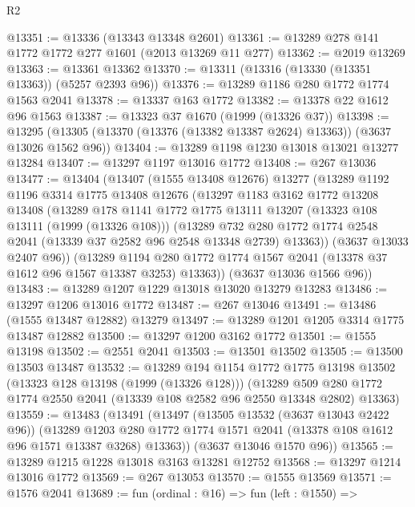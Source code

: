 \begin{lexlean}{R2}
\begin{coremodule}
@13351 := @13336 (@13343 @13348 @2601)
@13361 := @13289 @278 @141 @1772 @1772 @277 @1601 (@2013 @13269 @11 @277)
@13362 := @2019 @13269
@13363 := @13361 @13362
@13370 := @13311 (@13316 (@13330 (@13351 @13363)) (@5257 @2393 @96))
@13376 := @13289 @1186 @280 @1772 @1774 @1563 @2041
@13378 := @13337 @163 @1772
@13382 := @13378 @22 @1612 @96 @1563
@13387 := @13323 @37 @1670 (@1999 (@13326 @37))
@13398 := @13295 (@13305 (@13370 (@13376 (@13382 @13387 @2624) @13363)) (@3637 @13026 @1562 @96))
@13404 := @13289 @1198 @1230 @13018 @13021 @13277 @13284
@13407 := @13297 @1197 @13016 @1772
@13408 := @267 @13036
@13477 := @13404
    (@13407
      (@1555 @13408 @12676)
      @13277
      (@13289
        @1192
        @1196
        @3314
        @1775
        @13408
        @12676
        (@13297
          @1183
          @3162
          @1772
          @13208
          @13408
          (@13289
            @178
            @1141
            @1772
            @1775
            @13111
            @13207
            (@13323 @108 @13111 (@1999 (@13326 @108)))
            (@13289
              @732
              @280
              @1772
              @1774
              @2548
              @2041
              (@13339 @37 @2582 @96 @2548 @13348 @2739)
              @13363))
          (@3637 @13033 @2407 @96))
        (@13289
          @1194
          @280
          @1772
          @1774
          @1567
          @2041
          (@13378 @37 @1612 @96 @1567 @13387 @3253)
          @13363))
      (@3637 @13036 @1566 @96))
@13483 := @13289 @1207 @1229 @13018 @13020 @13279 @13283
@13486 := @13297 @1206 @13016 @1772
@13487 := @267 @13046
@13491 := @13486 (@1555 @13487 @12882) @13279
@13497 := @13289 @1201 @1205 @3314 @1775 @13487 @12882
@13500 := @13297 @1200 @3162 @1772
@13501 := @1555 @13198
@13502 := @2551 @2041
@13503 := @13501 @13502
@13505 := @13500 @13503 @13487
@13532 := @13289
    @194
    @1154
    @1772
    @1775
    @13198
    @13502
    (@13323 @128 @13198 (@1999 (@13326 @128)))
    (@13289 @509 @280 @1772 @1774 @2550 @2041 (@13339 @108 @2582 @96 @2550 @13348 @2802) @13363)
@13559 := @13483
    (@13491
      (@13497
        (@13505 @13532 (@3637 @13043 @2422 @96))
        (@13289
          @1203
          @280
          @1772
          @1774
          @1571
          @2041
          (@13378 @108 @1612 @96 @1571 @13387 @3268)
          @13363))
      (@3637 @13046 @1570 @96))
@13565 := @13289 @1215 @1228 @13018 @3163 @13281 @12752
@13568 := @13297 @1214 @13016 @1772
@13569 := @267 @13053
@13570 := @1555 @13569
@13571 := @1576 @2041
@13689 := fun (ordinal : @16) =>
  fun (left : @1550) =>

\end{coremodule}
\end{lexlean}
